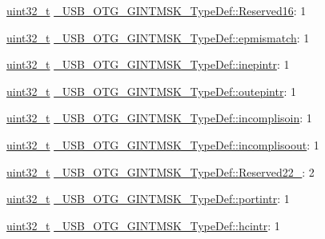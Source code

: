 \begin{DoxyCompactItemize}
\item 
\hyperlink{stdint_8h_a435d1572bf3f880d55459d9805097f62}{uint32\-\_\-t} \hyperlink{group___u_s_b___o_t_g___d_r_i_v_e_r_gad063fc81ea2baa6229a2381b9d9a32ee}{\-\_\-\-U\-S\-B\-\_\-\-O\-T\-G\-\_\-\-G\-I\-N\-T\-M\-S\-K\-\_\-\-Type\-Def\-::\-Reserved16}\-: 1
\item 
\hyperlink{stdint_8h_a435d1572bf3f880d55459d9805097f62}{uint32\-\_\-t} \hyperlink{group___u_s_b___o_t_g___d_r_i_v_e_r_ga736d5ec17a44d4d40e8ad96c66c86887}{\-\_\-\-U\-S\-B\-\_\-\-O\-T\-G\-\_\-\-G\-I\-N\-T\-M\-S\-K\-\_\-\-Type\-Def\-::epmismatch}\-: 1
\item 
\hyperlink{stdint_8h_a435d1572bf3f880d55459d9805097f62}{uint32\-\_\-t} \hyperlink{group___u_s_b___o_t_g___d_r_i_v_e_r_gab6b102fc65c62b3147c80449d950d46b}{\-\_\-\-U\-S\-B\-\_\-\-O\-T\-G\-\_\-\-G\-I\-N\-T\-M\-S\-K\-\_\-\-Type\-Def\-::inepintr}\-: 1
\item 
\hyperlink{stdint_8h_a435d1572bf3f880d55459d9805097f62}{uint32\-\_\-t} \hyperlink{group___u_s_b___o_t_g___d_r_i_v_e_r_gabc016abba6e4547fa6620cf6141d4f0f}{\-\_\-\-U\-S\-B\-\_\-\-O\-T\-G\-\_\-\-G\-I\-N\-T\-M\-S\-K\-\_\-\-Type\-Def\-::outepintr}\-: 1
\item 
\hyperlink{stdint_8h_a435d1572bf3f880d55459d9805097f62}{uint32\-\_\-t} \hyperlink{group___u_s_b___o_t_g___d_r_i_v_e_r_ga997c1a77060631b4a4c5eccfd51ddb38}{\-\_\-\-U\-S\-B\-\_\-\-O\-T\-G\-\_\-\-G\-I\-N\-T\-M\-S\-K\-\_\-\-Type\-Def\-::incomplisoin}\-: 1
\item 
\hyperlink{stdint_8h_a435d1572bf3f880d55459d9805097f62}{uint32\-\_\-t} \hyperlink{group___u_s_b___o_t_g___d_r_i_v_e_r_gaf418f00c9ff43efe4bbe8a39deee4f23}{\-\_\-\-U\-S\-B\-\_\-\-O\-T\-G\-\_\-\-G\-I\-N\-T\-M\-S\-K\-\_\-\-Type\-Def\-::incomplisoout}\-: 1
\item 
\hyperlink{stdint_8h_a435d1572bf3f880d55459d9805097f62}{uint32\-\_\-t} \hyperlink{group___u_s_b___o_t_g___d_r_i_v_e_r_gab0a0b72370ed119cc2a2629f9db7a22f}{\-\_\-\-U\-S\-B\-\_\-\-O\-T\-G\-\_\-\-G\-I\-N\-T\-M\-S\-K\-\_\-\-Type\-Def\-::\-Reserved22\-\_}\-: 2
\item 
\hyperlink{stdint_8h_a435d1572bf3f880d55459d9805097f62}{uint32\-\_\-t} \hyperlink{group___u_s_b___o_t_g___d_r_i_v_e_r_ga99e136933a390151d3db44096e15cfe0}{\-\_\-\-U\-S\-B\-\_\-\-O\-T\-G\-\_\-\-G\-I\-N\-T\-M\-S\-K\-\_\-\-Type\-Def\-::portintr}\-: 1
\item 
\hyperlink{stdint_8h_a435d1572bf3f880d55459d9805097f62}{uint32\-\_\-t} \hyperlink{group___u_s_b___o_t_g___d_r_i_v_e_r_ga6a68f8b28d6fb5337fa58e292bc19493}{\-\_\-\-U\-S\-B\-\_\-\-O\-T\-G\-\_\-\-G\-I\-N\-T\-M\-S\-K\-\_\-\-Type\-Def\-::hcintr}\-: 1

\end{DoxyCompactItemize}

